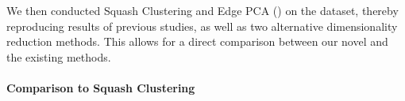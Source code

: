 We then conducted Squash Clustering and Edge PCA ()
on the dataset, thereby reproducing results of previous studies,
as well as two alternative dimensionality reduction methods.
This allows for a direct comparison between our novel and the existing methods.



\paragraph{Comparison to Squash Clustering}
\label{ch:Clustering:sec:Results:sub:BVDataset:par:SquashClustering}

